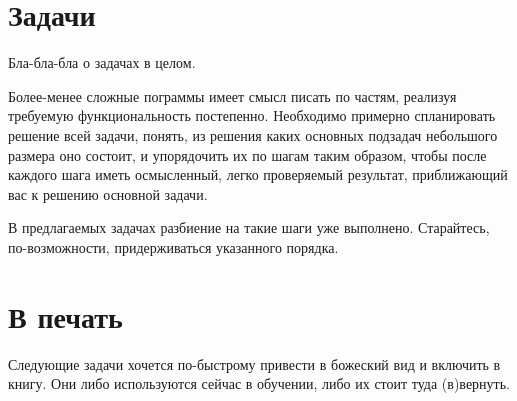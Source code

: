 \chapter{Задачи}

Бла-бла-бла о задачах в целом.

Более-менее сложные пограммы имеет смысл писать по частям, реализуя требуемую
функциональность постепенно. Необходимо примерно спланировать решение всей
задачи, понять, из решения каких основных подзадач небольшого размера оно
состоит, и упорядочить их по шагам таким образом, чтобы после каждого шага
иметь осмысленный, легко проверяемый результат, приближающий вас к решению
основной задачи.

В предлагаемых задачах разбиение на такие шаги уже выполнено. Старайтесь,
по-возможности, придерживаться указанного порядка.








\chapter{В печать}

Следующие задачи хочется по-быстрому привести в божеский вид и включить в
книгу. Они либо используются сейчас в обучении, либо их стоит туда (в)вернуть.











\endinput

\chapter{На доработку}

С этими задачами уже не столь очевидно, как надо поступить. Хотелось бы их
рано или поздно довести до ума и включить в общий котёл --- они пригодятся.
К сожалению, доработка требуется достаточно серъёзная.

